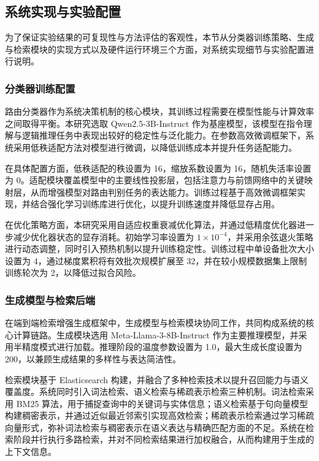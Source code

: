\subsection{系统实现与实验配置}
\label{sec:implementation_details}

为了保证实验结果的可复现性与方法评估的客观性，本节从分类器训练策略、生成与检索模块的实现方式以及硬件运行环境三个方面，对系统实现细节与实验配置进行说明。

\subsubsection{分类器训练配置}

路由分类器作为系统决策机制的核心模块，其训练过程需要在模型性能与计算效率之间取得平衡。本研究选取 Qwen2.5-3B-Instruct 作为基座模型，该模型在指令理解与逻辑推理任务中表现出较好的稳定性与泛化能力。在参数高效微调框架下，系统采用低秩适配方法对模型进行微调，以降低训练成本并提升任务适配能力。

在具体配置方面，低秩适配的秩设置为 16，缩放系数设置为 16，随机失活率设置为 0。适配模块覆盖模型中的主要线性投影层，包括注意力与前馈网络中的关键映射层，从而增强模型对路由判别任务的表达能力。训练过程基于高效微调框架实现，并结合强化学习训练库进行优化，以提升训练速度并降低显存占用。

在优化策略方面，本研究采用自适应权重衰减优化算法，并通过低精度优化器进一步减少优化器状态的显存消耗。初始学习率设置为 $1\times10^{-4}$，并采用余弦退火策略进行动态调整，同时引入预热机制以提升训练稳定性。训练过程中单设备批次大小设置为 4，通过梯度累积将有效批次规模扩展至 32，并在较小规模数据集上限制训练轮次为 2，以降低过拟合风险。

\subsubsection{生成模型与检索后端}

在端到端检索增强生成框架中，生成模型与检索模块协同工作，共同构成系统的核心计算链路。生成模块选用 Meta-Llama-3-8B-Instruct 作为主要推理模型，并采用半精度模式进行加载。推理阶段的温度参数设置为 1.0，最大生成长度设置为 200，以兼顾生成结果的多样性与表达简洁性。

检索模块基于 Elasticsearch 构建，并融合了多种检索技术以提升召回能力与语义覆盖度。系统同时引入词法检索、语义检索与稀疏表示检索三种机制。词法检索采用 BM25 算法，用于捕捉查询中的关键词与实体信息；语义检索基于句向量模型构建稠密表示，并通过近似最近邻索引实现高效检索；稀疏表示检索通过学习稀疏向量形式，弥补词法检索与稠密表示在语义表达与精确匹配方面的不足。系统在检索阶段并行执行多路检索，并对不同检索结果进行加权融合，从而构建用于生成的上下文信息。

